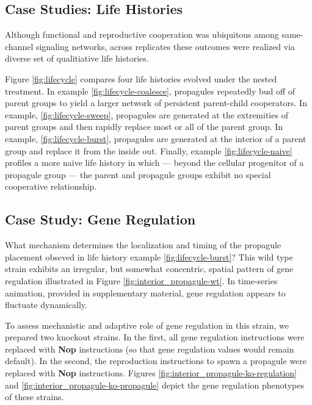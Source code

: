 \subsection{Case Studies: Life Histories} \label{sec:life-histories}

Although functional and reproductive cooperation was ubiquitous among same-channel signaling networks, across replicates these outcomes were realized via diverse set of qualitiative life histories.


Figure \ref{fig:lifecycle} compares four life histories evolved under the nested treatment.
In example \ref{fig:lifecycle-coalesce}, propagules repeatedly bud off of parent groups to yield a larger network of persistent parent-child cooperators.
In example, \ref{fig:lifecycle-sweep}, propagules are generated at the extremities of parent groups and then rapidly replace most or all of the parent group.
In example, \ref{fig:lifecycle-burst}, propagules are generated at the interior of a parent group and replace it from the inside out.
Finally, example \ref{fig:lifecycle-naive} profiles a more naive life history in which --- beyond the cellular progenitor of a propagule group --- the parent and propagule groups exhibit no special cooperative relationship.

\subsection{Case Study: Gene Regulation} \label{sec:gene-regulation}



What mechanism determines the localization and timing of the propagule placement obseved in life history example \ref{fig:lifecycle-burst}?
This wild type strain exhibits an irregular, but somewhat concentric, spatial pattern of gene regulation illustrated in Figure \ref{fig:interior_propagule-wt}.
In time-series animation, provided in supplementary material, gene regulation appears to fluctuate dynamically.

To assess mechanistic and adaptive role of gene regulation in this strain, we prepared two knockout strains.
In the first, all gene regulation instructions were replaced with \textbf{Nop} instructions (so that gene regulation values would remain default).
In the second, the reproduction instructions to spawn a propagule were replaced with \textbf{Nop} instructions.
Figures \ref{fig:interior_propagule-ko-regulation} and \ref{fig:interior_propagule-ko-propagule} depict the gene regulation phenotypes of these strains.

